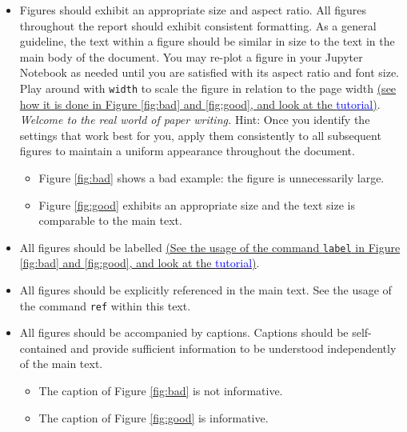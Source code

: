 \documentclass[
	german,
	accentcolor=9c,%
	type=intern,
	marginpar=false
	]{tudapub}
\begin{document}
\begin{itemize}                     %
\item Figures should exhibit an appropriate size and aspect ratio. All figures throughout the report should exhibit consistent formatting. 
As a general guideline, the text within a figure should be similar in size to the text in the main body of the document. You may re-plot a figure in your Jupyter Notebook as needed until you are satisfied with its aspect ratio and font size. Play around with \texttt{width} to scale the figure in relation to the page width \href{https://www.overleaf.com/learn/latex/Inserting_Images#Changing_the_image_size_and_rotating_the_picture}{(see how it is done in Figure \ref{fig:bad} and \ref{fig:good}, and look at the \textcolor{blue}{tutorial})}. \emph{Welcome to the real world of paper writing.} Hint: Once you identify the settings that work best for you, apply them consistently to all subsequent figures to maintain a uniform appearance throughout the document.
    \begin{itemize}          
    \item Figure \ref{fig:bad} shows a bad example: the figure is unnecessarily large. 
    \item Figure \ref{fig:good} exhibits an appropriate size and the text size is comparable to the main text.
    \end{itemize}  
\item All figures should be labelled \href{https://www.overleaf.com/learn/latex/Learn_LaTeX_in_30_minutes#Captions,_labels_and_references}{(See the usage of the command \texttt{label} in Figure \ref{fig:bad} and \ref{fig:good}, and look at the \textcolor{blue}{tutorial})}.
\item All figures should be explicitly referenced in the main text. See the usage of the command \texttt{ref} within this text.
\item All figures should be accompanied by captions. Captions should be self-contained and provide sufficient information to be understood independently of the main text.
    \begin{itemize}                    
    \item The caption of Figure \ref{fig:bad} is not informative. 
    \item The caption of Figure \ref{fig:good} is informative.
    \end{itemize}  
\end{itemize}                       %
\end{document}
